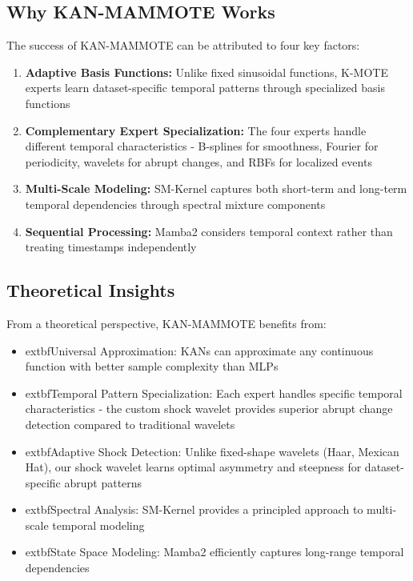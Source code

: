\documentclass[conference]{IEEEtran}
\begin{document}
\subsection{Why KAN-MAMMOTE Works}

The success of KAN-MAMMOTE can be attributed to four key factors:

\begin{enumerate}
\item \textbf{Adaptive Basis Functions:} Unlike fixed sinusoidal functions, K-MOTE experts learn dataset-specific temporal patterns through specialized basis functions
\item \textbf{Complementary Expert Specialization:} The four experts handle different temporal characteristics - B-splines for smoothness, Fourier for periodicity, wavelets for abrupt changes, and RBFs for localized events
\item \textbf{Multi-Scale Modeling:} SM-Kernel captures both short-term and long-term temporal dependencies through spectral mixture components
\item \textbf{Sequential Processing:} Mamba2 considers temporal context rather than treating timestamps independently
\end{enumerate}

\subsection{Theoretical Insights}

From a theoretical perspective, KAN-MAMMOTE benefits from:
\begin{itemize}
\item 	extbf{Universal Approximation:} KANs can approximate any continuous function with better sample complexity than MLPs
\item 	extbf{Temporal Pattern Specialization:} Each expert handles specific temporal characteristics - the custom shock wavelet provides superior abrupt change detection compared to traditional wavelets
\item 	extbf{Adaptive Shock Detection:} Unlike fixed-shape wavelets (Haar, Mexican Hat), our shock wavelet learns optimal asymmetry and steepness for dataset-specific abrupt patterns
\item 	extbf{Spectral Analysis:} SM-Kernel provides a principled approach to multi-scale temporal modeling
\item 	extbf{State Space Modeling:} Mamba2 efficiently captures long-range temporal dependencies
\end{itemize}
\end{document}
